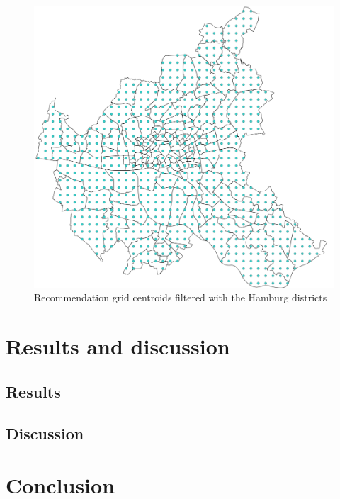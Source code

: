 \documentclass[a4paper, 11pt, oneside]{Thesis}  %
\begin{document}
\begin{figure}[h]
\includegraphics[scale=0.7]{Figures/Recommendation_map/Recommendation_Grid_Centroids_reduced.png}
\centering
\caption{Recommendation grid centroids filtered with the Hamburg districts}
\label{fig:Recommendation_Grid_Centroids_reduced}
\end{figure}



\chapter{Results and discussion}

\section{Results}

\section{Discussion}

\chapter{Conclusion}



\end{document}
